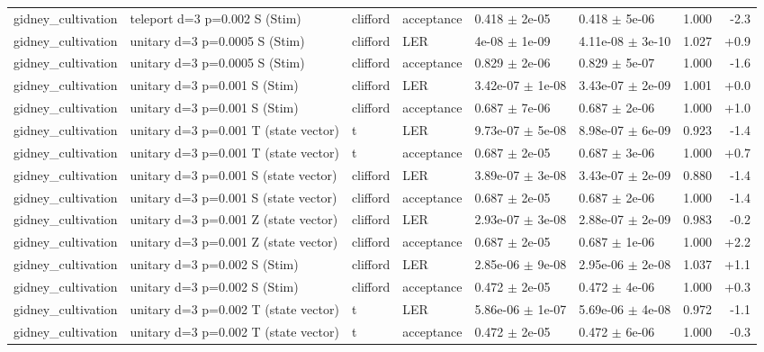 \documentclass[10pt]{article}
\begin{document}
{\begin{longtable}{l l l l l l r r}
gidney\_cultivation & teleport d=3 p=0.002 S (Stim) & clifford & acceptance & 0.418 $\pm$ 2e-05 & 0.418 $\pm$ 5e-06 & 1.000 & -2.3 \\
gidney\_cultivation & unitary d=3 p=0.0005 S (Stim) & clifford & LER & 4e-08 $\pm$ 1e-09 & 4.11e-08 $\pm$ 3e-10 & 1.027 & +0.9 \\
gidney\_cultivation & unitary d=3 p=0.0005 S (Stim) & clifford & acceptance & 0.829 $\pm$ 2e-06 & 0.829 $\pm$ 5e-07 & 1.000 & -1.6 \\
gidney\_cultivation & unitary d=3 p=0.001 S (Stim) & clifford & LER & 3.42e-07 $\pm$ 1e-08 & 3.43e-07 $\pm$ 2e-09 & 1.001 & +0.0 \\
gidney\_cultivation & unitary d=3 p=0.001 S (Stim) & clifford & acceptance & 0.687 $\pm$ 7e-06 & 0.687 $\pm$ 2e-06 & 1.000 & +1.0 \\
gidney\_cultivation & unitary d=3 p=0.001 T (state vector) & t & LER & 9.73e-07 $\pm$ 5e-08 & 8.98e-07 $\pm$ 6e-09 & 0.923 & -1.4 \\
gidney\_cultivation & unitary d=3 p=0.001 T (state vector) & t & acceptance & 0.687 $\pm$ 2e-05 & 0.687 $\pm$ 3e-06 & 1.000 & +0.7 \\
gidney\_cultivation & unitary d=3 p=0.001 S (state vector) & clifford & LER & 3.89e-07 $\pm$ 3e-08 & 3.43e-07 $\pm$ 2e-09 & 0.880 & -1.4 \\
gidney\_cultivation & unitary d=3 p=0.001 S (state vector) & clifford & acceptance & 0.687 $\pm$ 2e-05 & 0.687 $\pm$ 2e-06 & 1.000 & -1.4 \\
gidney\_cultivation & unitary d=3 p=0.001 Z (state vector) & clifford & LER & 2.93e-07 $\pm$ 3e-08 & 2.88e-07 $\pm$ 2e-09 & 0.983 & -0.2 \\
gidney\_cultivation & unitary d=3 p=0.001 Z (state vector) & clifford & acceptance & 0.687 $\pm$ 2e-05 & 0.687 $\pm$ 1e-06 & 1.000 & +2.2 \\
gidney\_cultivation & unitary d=3 p=0.002 S (Stim) & clifford & LER & 2.85e-06 $\pm$ 9e-08 & 2.95e-06 $\pm$ 2e-08 & 1.037 & +1.1 \\
gidney\_cultivation & unitary d=3 p=0.002 S (Stim) & clifford & acceptance & 0.472 $\pm$ 2e-05 & 0.472 $\pm$ 4e-06 & 1.000 & +0.3 \\
gidney\_cultivation & unitary d=3 p=0.002 T (state vector) & t & LER & 5.86e-06 $\pm$ 1e-07 & 5.69e-06 $\pm$ 4e-08 & 0.972 & -1.1 \\
gidney\_cultivation & unitary d=3 p=0.002 T (state vector) & t & acceptance & 0.472 $\pm$ 2e-05 & 0.472 $\pm$ 6e-06 & 1.000 & -0.3 \\

\end{longtable}}
\end{document}
